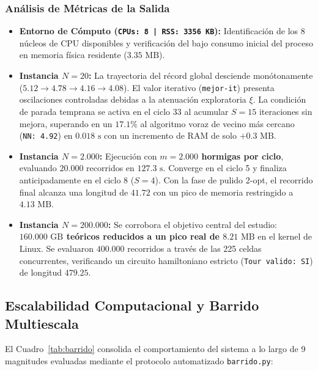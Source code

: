 \documentclass[11pt,a4paper]{article}
\begin{document}
\subsubsection{Análisis de Métricas de la Salida}
\begin{itemize}
    \item \textbf{Entorno de Cómputo (\texttt{CPUs: 8 | RSS: 3356 KB}):} Identificación de los 8 núcleos de CPU disponibles y verificación del bajo consumo inicial del proceso en memoria física residente ($3.35\text{ MB}$).
    \item \textbf{Instancia $N=20$:} La trayectoria del récord global desciende monótonamente ($5.12 \to 4.78 \to 4.16 \to 4.08$). El valor iterativo (\texttt{mejor-it}) presenta oscilaciones controladas debidas a la atenuación exploratoria $\xi$. La condición de parada temprana se activa en el ciclo 33 al acumular $S=15$ iteraciones sin mejora, superando en un $17.1\%$ al algoritmo voraz de vecino más cercano (\texttt{NN: 4.92}) en $0.018\text{ s}$ con un incremento de RAM de solo $+0.3\text{ MB}$.
    \item \textbf{Instancia $N=2.000$:} Ejecución con \textbf{$m = 2.000$ hormigas por ciclo}, evaluando $20.000$ recorridos en $127.3\text{ s}$. Converge en el ciclo 5 y finaliza anticipadamente en el ciclo 8 ($S=4$). Con la fase de pulido 2-opt, el recorrido final alcanza una longitud de $41.72$ con un pico de memoria restringido a $4.13\text{ MB}$.
    \item \textbf{Instancia $N=200.000$:} Se corrobora el objetivo central del estudio: \textbf{$160.000\text{ GB}$ teóricos reducidos a un pico real de $8.21\text{ MB}$} en el kernel de Linux. Se evaluaron $400.000$ recorridos a través de las 225 celdas concurrentes, verificando un circuito hamiltoniano estricto (\texttt{Tour valido: SI}) de longitud $479.25$.
\end{itemize}

\subsection{Escalabilidad Computacional y Barrido Multiescala}
El Cuadro~\ref{tab:barrido} consolida el comportamiento del sistema a lo largo de 9 magnitudes evaluadas mediante el protocolo automatizado \texttt{barrido.py}:
\end{document}
